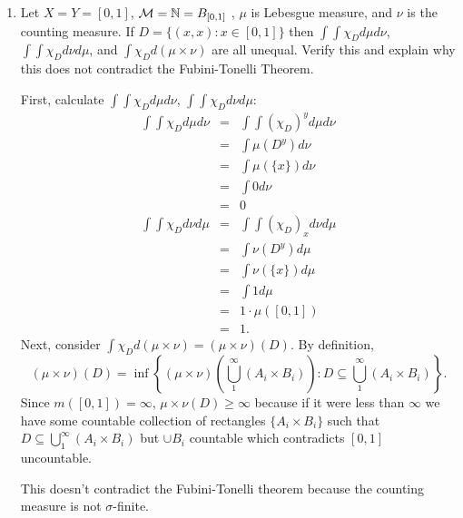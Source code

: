 \begin{enumerate}
\item Let $X=Y=[0,1]$, ${\mathcal M} = {\mathbb N} = B_{[0,1]}$	, $\mu$ is Lebesgue measure, and $\nu$ is the counting measure. If $D=\{(x,x): x \in [0,1]\}$ then $\int \int \chi_D d \mu d\nu$, $\int \int \chi_D d \nu d \mu$, and $\int \chi_D d (\mu \times \nu)$ are all unequal. Verify this and explain why this does not contradict the Fubini-Tonelli Theorem.
\begin{pf}
First, calculate $\int \int \chi_D d \mu d\nu$, $\int \int \chi_D d \nu d \mu$: 
\begin{eqnarray*}
 	\int \int \chi_D d \mu d\nu & = & \int \int \left(\chi_D \right)^y d \mu d \nu \\
 	& = & \int \mu(D^y) d \nu \\
 	& = & \int \mu ( \{ x \}) d \nu \\
 	& = & \int 0 d \nu \\
 	& = & 0\\
 	\int \int \chi_D d \nu d\mu & = & \int \int \left(\chi_D \right)_x  d \nu d \mu \\
 	& = & \int \nu(D^y) d \mu \\
 	& = & \int \nu ( \{ x \}) d \mu \\
 	& = & \int 1 d \mu \\
 	& = & 1\cdot\mu([0,1])\\
 	& = & 1.
 \end{eqnarray*}
 Next, consider $\int \chi_D d (\mu \times \nu)=(\mu \times \nu)(D)$.  By definition, \[
 (\mu \times \nu)(D)=\inf \left\{ (\mu \times \nu)\left( \bigcup_1^\infty (A_i \times B_i)\right): D \subseteq \bigcup_1^\infty (A_i \times B_i) \right\}.
 \]
Since $m([0,1])=\infty$, $ \mu \times \nu ( D) \geq \infty$ because if it were less than $\infty$ we have some countable collection of rectangles $\{A_i \times B_i\}$ such that $D \subseteq \bigcup_1^\infty (A_i \times B_i)$ but $\cup B_i$ countable which contradicts $[0,1]$ uncountable.

This doesn't contradict the Fubini-Tonelli theorem because the counting measure is not $\sigma$-finite.
\end{pf}


\end{enumerate}
